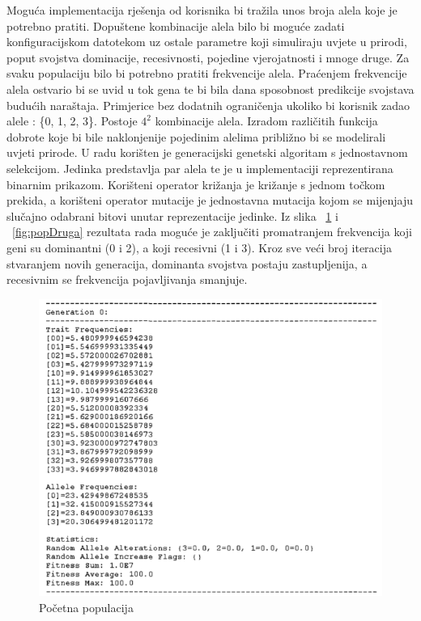 \documentclass[times, utf8, zavrsni, numeric]{fer}
\begin{document}
Moguća implementacija rješenja od korisnika bi tražila unos broja alela koje je potrebno pratiti. Dopuštene kombinacije alela bilo bi moguće zadati konfiguracijskom datotekom uz ostale parametre koji simuliraju uvjete u prirodi, poput svojstva dominacije, recesivnosti, pojedine vjerojatnosti i mnoge druge. Za svaku populaciju bilo bi potrebno pratiti frekvencije alela. Praćenjem frekvencije alela ostvario bi se uvid u tok gena te bi bila dana sposobnost predikcije svojstava budućih naraštaja. Primjerice bez dodatnih ograničenja ukoliko bi korisnik zadao alele : \{0, 1, 2, 3\}. Postoje \(4^2\) kombinacije alela. Izradom različitih funkcija dobrote koje bi bile naklonjenije pojedinim alelima približno bi se modelirali uvjeti prirode. U radu \cite{applicationOfBioinformatics} korišten je generacijski genetski algoritam s jednostavnom selekcijom. Jedinka predstavlja par alela te je u implementaciji reprezentirana binarnim prikazom. Korišteni operator križanja je križanje s jednom točkom prekida, a korišteni operator mutacije je jednostavna mutacija kojom se mijenjaju slučajno odabrani bitovi unutar reprezentacije jedinke. Iz slika ~\ref{fig:popPrva} i ~\ref{fig:popDruga} rezultata rada \cite{applicationOfBioinformatics} moguće je zaključiti promatranjem frekvencija koji geni su dominantni (0 i 2), a koji recesivni (1 i 3). Kroz sve veći broj iteracija stvaranjem novih generacija, dominanta svojstva postaju zastupljenija, a recesivnim se frekvencija pojavljivanja smanjuje. 
\begin{figure}[!httb]
	\includegraphics[]{slike/popPrva.PNG}
	\centering
	\caption{Početna populacija}
	\label{fig:popPrva}
\end{figure}
\end{document}
